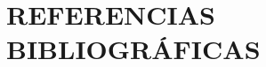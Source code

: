 
\begingroup
    \chapter{REFERENCIAS BIBLIOGRÁFICAS}
    \sloppy                                 %
    \printbibliography[heading=none]
\endgroup